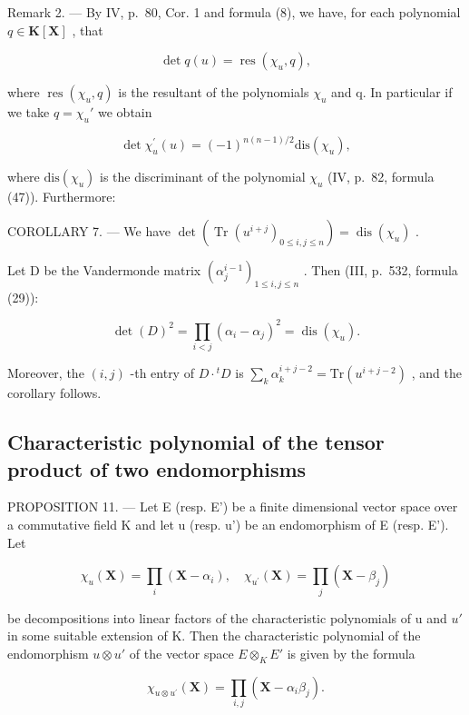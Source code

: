Remark 2. --- By IV, p.~80, Cor. 1 and formula (8), we have, for each polynomial \(q \in \mathbf{K}[\mathbf{X}]\) , that

\[
\det q (u) = \operatorname{res} \left(\chi_ {u}, q\right),\tag{9}
\]

where \(\operatorname{res}(\chi_{u}, q)\) is the resultant of the polynomials \(\chi_{u}\) and q. In particular if we take \(q = \chi_{u}'\) we obtain

\[
\det \chi_ {u} ^ {\prime} (u) = (- 1) ^ {n (n - 1) / 2} \mathrm{dis} (\chi_ {u}),\tag{10}
\]

where \(\mathrm{dis}(\chi_{u})\) is the discriminant of the polynomial \(\chi_{u}\) (IV, p.~82, formula (47)). Furthermore:

COROLLARY 7. --- We have \(\det\left(\operatorname{Tr}\left(u^{i+j}\right)_{0\leqslant i,j\leqslant n}\right)=\operatorname{dis}\left(\chi_{u}\right)\) .

Let D be the Vandermonde matrix \((\alpha_j^{i-1})_{1 \leqslant i, j \leqslant n}\) . Then (III, p.~532, formula (29)):

\[
\det (D) ^ {2} = \prod_ {i <   j} (\alpha_ {i} - \alpha_ {j}) ^ {2} = \operatorname{dis} (\chi_ {u}).
\]

Moreover, the \((i,j)\) -th entry of \(D\cdot {}^t D\) is \(\sum_{k}\alpha_{k}^{i + j - 2} = \mathrm{Tr}(u^{i + j - 2})\) , and the corollary follows.

\subsection{Characteristic polynomial of the tensor product of two endomorphisms}

PROPOSITION 11. --- Let E (resp. E') be a finite dimensional vector space over a commutative field K and let u (resp. u') be an endomorphism of E (resp. E'). Let

\[
\chi_ {u} (\mathbf {X}) = \prod_ {i} \left(\mathbf {X} - \alpha_ {i}\right), \quad \chi_ {u ^ {\prime}} (\mathbf {X}) = \prod_ {j} \left(\mathbf {X} - \beta_ {j}\right)
\]

be decompositions into linear factors of the characteristic polynomials of u and \(u'\) in some suitable extension of K. Then the characteristic polynomial of the endomorphism \(u \otimes u'\) of the vector space \(E \otimes_{K} E'\) is given by the formula

\[
\chi_ {u \otimes u ^ {\prime}} (\mathbf {X}) = \prod_ {i, j} \left(\mathbf {X} - \alpha_ {i} \beta_ {j}\right).
\]

